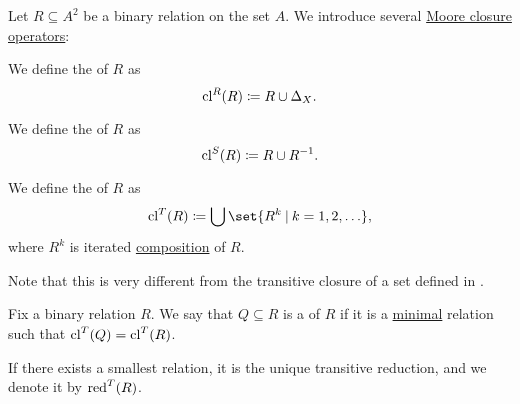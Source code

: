 \begin{definition}\label{def:relation_closures}\mimprovised
  Let \( R \subseteq A^2 \) be a binary relation on the set \( A \). We introduce several \hyperref[def:moore_closure_operator]{Moore closure operators}:
  \begin{thmenum}
     We define the  of \( R \) as
    \begin{equation*}
      \operatorname{cl}^R(R) \coloneqq R \cup \Delta_X.
    \end{equation*}

     We define the  of \( R \) as
    \begin{equation*}
      \operatorname{cl}^S(R) \coloneqq R \cup R^{-1}.
    \end{equation*}

     We define the  of \( R \) as
    \begin{equation*}
      \cl^T(R) \coloneqq \bigcup \set{ R^k \given k = 1, 2, \ldots },
    \end{equation*}
    where \( R^k \) is iterated \hyperref[def:binary_relation/composition]{composition} of \( R \).

    Note that this is very different from the transitive closure of a set defined in .
  \end{thmenum}
\end{definition}

\begin{definition}\label{def:transitive_reduction}
  Fix a binary relation \( R \). We say that \( Q \subseteq R \) is a  of \( R \) if it is a \hyperref[def:extremal_points/maximal_and_minimal_element]{minimal} relation such that \( \operatorname{cl}^T(Q) = \operatorname{cl}^T(R) \).

  If there exists a smallest relation, it is the unique transitive reduction, and we denote it by \( \operatorname{red}^T(R) \).
\end{definition}

